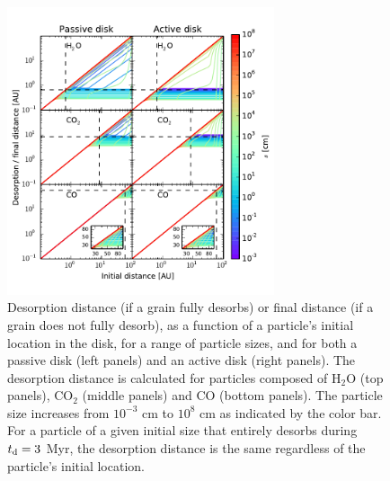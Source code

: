 \documentclass[apj]{emulateapj}
\begin{document}
\begin{figure}[tb]
\centering
\includegraphics[width=0.7\textwidth]{desorption_distance_passive_active_colorbar_test2.pdf}
\caption{Desorption distance (if a grain fully desorbs) or final distance (if a grain does not fully desorb), as a function of a particle's initial location in the disk, for a range of particle sizes, and for both a passive disk (left panels) and an active disk (right panels). The desorption distance is calculated for particles composed of H$_2$O (top panels), CO$_2$ (middle panels) and CO (bottom panels). The particle size increases from $10^{-3}$ cm to $10^8$ cm as indicated by the color bar. For a particle of a given initial size that entirely desorbs during $t_{\rm d}=3$ Myr, the desorption distance is the same regardless of the particle's initial location.} 
\label{fig:snowlines}
\end{figure}
\end{document}

